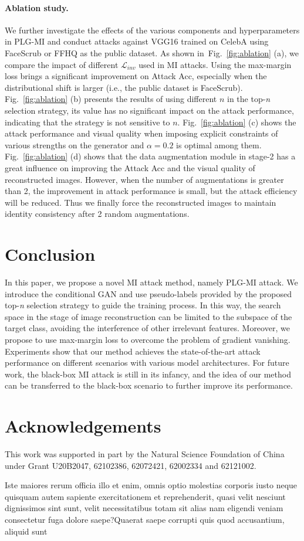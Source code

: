 \documentclass[letterpaper]{article} %
\newcommand{\Fref}[1]{Fig.~\ref{#1}}
\begin{document}
\paragraph{Ablation study.}
We further investigate the effects of the various components and hyperparameters in PLG-MI and conduct attacks against VGG16 trained on CelebA using FaceScrub or FFHQ as the public dataset. As shown in~\Fref{fig:ablation} (a), we compare the impact of different $\mathcal{L}_{inv}$ used in MI attacks. Using the max-margin loss brings a significant improvement on Attack Acc, especially when the distributional shift is larger (i.e., the public dataset is FaceScrub). \Fref{fig:ablation} (b) presents the results of using different $n$ in the top-\emph{n} selection strategy, its value has no significant impact on the attack performance, indicating that the strategy is not sensitive to $n$. \Fref{fig:ablation} (c) shows the attack performance and visual quality when imposing explicit constraints of various strengths on the generator and $\alpha=0.2$ is optimal among them. \Fref{fig:ablation} (d) shows that the data augmentation module in stage-2 has a great influence on improving the Attack Acc and the visual quality of reconstructed images. However, when the number of augmentations is greater than 2, the improvement in attack performance is small, but the attack efficiency will be reduced. Thus we finally force the reconstructed images to maintain identity consistency after 2 random augmentations.

\section{Conclusion}
In this paper, we propose a novel MI attack method, namely PLG-MI attack. We introduce the conditional GAN and use pseudo-labels provided by the proposed top-\emph{n} selection strategy to guide the training process. In this way, the search space in the stage of image reconstruction can be limited to the subspace of the target class, avoiding the interference of other irrelevant features. Moreover, we propose to use max-margin loss to overcome the problem of gradient vanishing. Experiments show that our method achieves the state-of-the-art attack performance on different scenarios with various model architectures. For future work, the black-box MI attack is still in its infancy, and the idea of our method can be transferred to the black-box scenario to further improve its performance.

\section*{Acknowledgements}
This work was supported in part by the Natural Science Foundation of China
under Grant  U20B2047, 62102386, 62072421, 62002334 and 62121002.


Iste maiores rerum officia illo et enim, omnis optio molestias corporis iusto neque quisquam autem sapiente exercitationem et reprehenderit, quasi velit nesciunt dignissimos sint sunt, velit necessitatibus totam sit alias nam eligendi veniam consectetur fuga dolore saepe?Quaerat saepe corrupti quis quod accusantium, aliquid sunt

\end{document}
